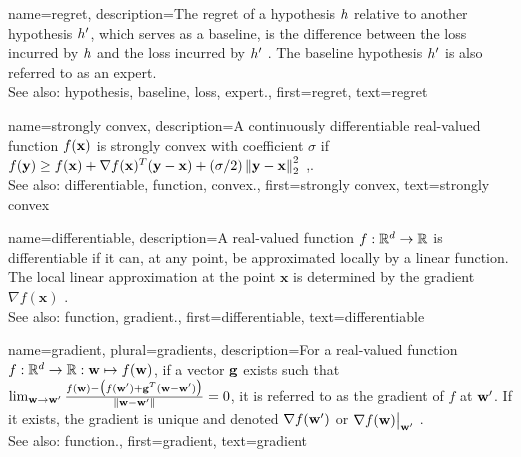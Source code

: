{name={regret},
	description={The regret of a \gls{hypothesis} $h$ relative to 
		another \gls{hypothesis} $h'$, which serves as a \gls{baseline}, 
		is the difference between the \gls{loss} incurred by $h$ and the \gls{loss} 
		incurred by $h'$ \cite{PredictionLearningGames}. 
		The \gls{baseline} \gls{hypothesis} $h'$ is also referred to as an \gls{expert}.
					\\ 
		See also: \gls{hypothesis}, \gls{baseline}, \gls{loss}, \gls{expert}.},
	first={regret},
	text={regret} 
}

{name={strongly convex},
	description={A continuously \gls{differentiable} real-valued 
		\gls{function} $f({\bf x})$ is strongly \gls{convex} with coefficient $\sigma$ if $f({\bf y}) \geq f({\bf x}) + \nabla f({\bf x})^{T} ({\bf y} - {\bf x}) + (\sigma/2) \left\Vert {{\bf y}- {\bf x}} \right\Vert_{2}^{2}$ \cite{nesterov04},\cite[Sec. B.1.1]{CvxAlgBertsekas}.
					\\ 
		See also: \gls{differentiable}, \gls{function}, \gls{convex}.},
	first={strongly convex},
	text={strongly convex} 
}

{name={differentiable},
	description={A real-valued \gls{function} $f: \mathbb{R}^{d} \rightarrow \mathbb{R}$ 
		is differentiable if it can, at any point, be approximated locally by a linear 
		\gls{function}. The local linear approximation at the point $\mathbf{x}$ is determined 
		by the \gls{gradient} $\nabla f ( \mathbf{x})$ \cite{RudinBookPrinciplesMatheAnalysis}.
					\\ 
		See also: \gls{function}, \gls{gradient}.},
	first={differentiable},
	text={differentiable} 
}

{name={gradient}, plural={gradients},
	description={For a real-valued \gls{function} 
		$f: \mathbb{R}^{d} \rightarrow \mathbb{R}: {\bf w} \mapsto f({\bf w})$, 
		if a vector ${\bf g}$ exists such that 
		$\lim_{{\bf w} \rightarrow {\bf w}'} \frac{f({\bf w}) - \big(f({\bf w}')+ {\bf g}^{T} ({\bf w}- {\bf w}') \big) }{\| {\bf w}-{\bf w}'\|}=0$, 
		it is referred to as the gradient of $f$ at ${\bf w}'$. If it exists, the gradient is unique and 
		denoted $\nabla f({\bf w}')$ or $\nabla f({\bf w})\big|_{{\bf w}'}$ \cite{RudinBookPrinciplesMatheAnalysis}.
		\\
		See also: \gls{function}.},
	first={gradient},
	text={gradient} 
}

